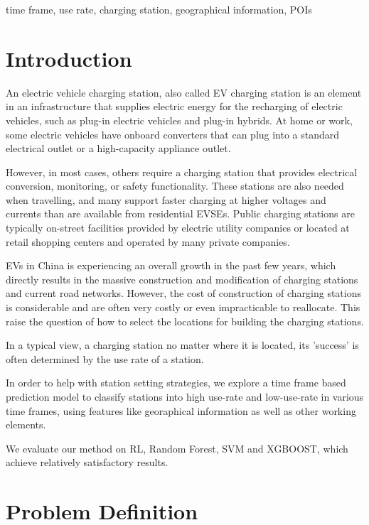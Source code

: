 \documentclass[conference]{IEEEtran}
\begin{document}
\begin{IEEEkeywords}
time frame, use rate, charging station, geographical information, POIs
\end{IEEEkeywords}

\section{Introduction}
An electric vehicle charging station, also called EV charging station is an element in an infrastructure that supplies electric energy for the recharging of electric vehicles, such as plug-in electric vehicles and plug-in hybrids. At home or work, some electric vehicles have onboard converters that can plug into a standard electrical outlet or a high-capacity appliance outlet. 

However, in most cases, others require a charging station that provides electrical conversion, monitoring, or safety functionality. These stations are also needed when travelling, and many support faster charging at higher voltages and currents than are available from residential EVSEs. Public charging stations are typically on-street facilities provided by electric utility companies or located at retail shopping centers and operated by many private companies.

EVs in China is experiencing an overall growth in the past few years, which directly results in the massive construction and modification of charging stations and current road networks. However, the cost of construction of charging stations is considerable and are often very costly or even impracticable to reallocate. This raise the question of how to select the locations for building the charging stations.

In a typical view, a charging station no matter where it is located, its 'success' is often determined by the use rate of a station.  

In order to help with station setting strategies, we explore a time frame based prediction model to classify stations into high use-rate and low-use-rate in various time frames, using features like georaphical information as well as other working elements.

We evaluate our method on RL, Random Forest, SVM and XGBOOST, which achieve relatively satisfactory results.

\section{Problem Definition}
\end{document}
